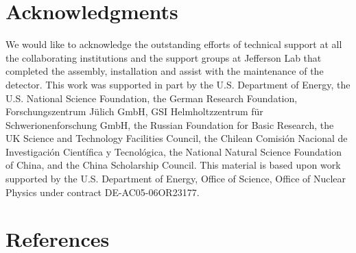 \documentclass{elsarticle}
\begin{document}

\tableofcontents




% 







  




   


\section{Acknowledgments}  
We would like to acknowledge the outstanding efforts of technical support at all the collaborating institutions and the support groups at Jefferson Lab that completed the assembly, installation
and assist with the maintenance of the detector.  This work was supported in part by the U.S. Department of Energy, the U.S. National Science Foundation, the German Research Foundation, Forschungszentrum J\"ulich GmbH, GSI Helmholtzzentrum f\"{u}r Schwerionenforschung GmbH, the Russian Foundation for Basic Research, the UK Science and Technology Facilities Council, the Chilean Comisi\'{o}n Nacional de Investigaci\'{o}n Cient\'{i}fica y Tecnol\'{o}gica, the National Natural Science Foundation of China, and the China Scholarship Council. This material is based upon work supported by the U.S. Department of Energy, Office of Science, Office of Nuclear Physics under contract DE-AC05-06OR23177. 

\newpage

\section*{References}
   

%
%

\end{document}
